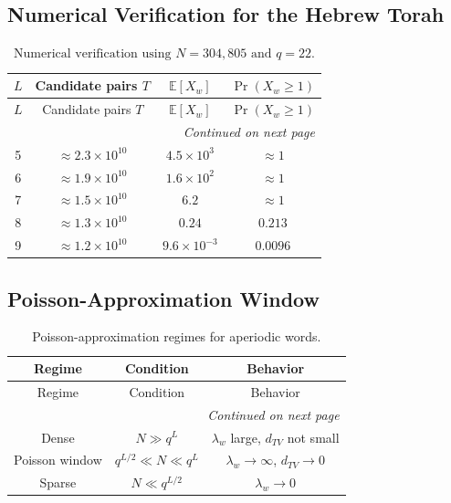 \documentclass[11pt]{amsart}
\theoremstyle{plain}
\theoremstyle{remark}
\begin{document}
\subsection{Numerical Verification for the Hebrew Torah}

\begin{longtable}{cccc}
	\caption{$\begin{aligned}
			\text{Numerical verification using } N = 304{,}805 \text{ and } q = 22.
	\end{aligned}$}\\
	\toprule
	\(L\) & Candidate pairs \(T\) & \(\mathbb{E}[X_w]\) & \(\Pr(X_w \ge 1)\) \\
	\midrule
	\endfirsthead
	
	\toprule
	\(L\) & Candidate pairs \(T\) & \(\mathbb{E}[X_w]\) & \(\Pr(X_w \ge 1)\) \\
	\midrule
	\endhead
	
	\midrule
	\multicolumn{4}{r}{\textit{Continued on next page}} \\
	\endfoot
	
	\bottomrule
	\endlastfoot
	
	5  & \(\approx 2.3 \times 10^{10}\) & \(4.5 \times 10^{3}\) & \(\approx 1\) \\
	6  & \(\approx 1.9 \times 10^{10}\) & \(1.6 \times 10^{2}\) & \(\approx 1\) \\
	7  & \(\approx 1.5 \times 10^{10}\) & \(6.2\) & \(\approx 1\) \\
	8  & \(\approx 1.3 \times 10^{10}\) & \(0.24\) & \(0.213\) \\
	9  & \(\approx 1.2 \times 10^{10}\) & \(9.6 \times 10^{-3}\) & \(0.0096\) \\
\end{longtable}

\subsection{Poisson-Approximation Window}

\begin{longtable}{ccc}
	\caption{Poisson-approximation regimes for aperiodic words.}\\
	\toprule
	Regime & Condition & Behavior \\
	\midrule
	\endfirsthead
	
	\toprule
	Regime & Condition & Behavior \\
	\midrule
	\endhead
	
	\midrule
	\multicolumn{3}{r}{\textit{Continued on next page}} \\
	\endfoot
	
	\bottomrule
	\endlastfoot
	
	Dense & \(N \gg q^{L}\) & \(\lambda_w\) large, \(d_{TV}\) not small \\
	Poisson window & \(q^{L/2} \ll N \ll q^{L}\) & \(\lambda_w \to \infty\), \(d_{TV} \to 0\) \\
	Sparse & \(N \ll q^{L/2}\) & \(\lambda_w \to 0\) \\
\end{longtable}
\newpage
\end{document}
